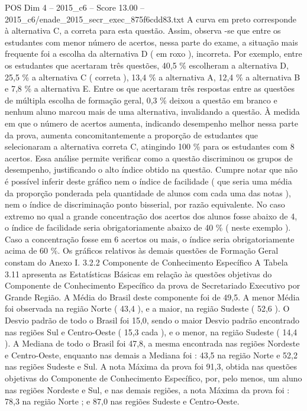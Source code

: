 \begin{textsample}{POS Dim 4 – 2015\_c6 – Score 13.00 – 2015\_c6/enade\_2015\_secr\_exec\_875f6cdd83.txt}
A curva em preto corresponde à alternativa C, a correta para esta questão.
Assim, observa -se que entre os estudantes com menor número de acertos, nessa parte do exame, a situação mais frequente foi a escolha da alternativa D ( em roxo ), incorreta.
Por exemplo, entre os estudantes que acertaram três questões, 40,5 \% escolheram a alternativa D, 25,5 \% a alternativa C ( correta ), 13,4 \% a alternativa A, 12,4 \% a alternativa B e 7,8 \% a alternativa E.
Entre os que acertaram três respostas entre as questões de múltipla escolha de formação geral, 0,3 \% deixou a questão em branco e nenhum aluno marcou mais de uma alternativa, invalidando a questão.
À medida em que o número de acertos aumenta, indicando desempenho melhor nessa parte da prova, aumenta concomitantemente a proporção de estudantes que selecionaram a alternativa correta C, atingindo 100 \% para os estudantes com 8 acertos.
Essa análise permite verificar como a questão discriminou os grupos de desempenho, justificando o alto índice obtido na questão.
Cumpre notar que não é possível inferir deste gráfico nem o índice de facilidade ( que seria uma média da proporção ponderada pela quantidade de alunos com cada uma das notas ), nem o índice de discriminação ponto bisserial, por razão equivalente.
No caso extremo no qual a grande concentração dos acertos dos alunos fosse abaixo de 4, o índice de facilidade seria obrigatoriamente abaixo de 40 \% ( neste exemplo ).
Caso a concentração fosse em 6 acertos ou mais, o índice seria obrigatoriamente acima de 60 \%.
Os gráficos relativos às demais questões de Formação Geral constam do Anexo I. 3.2.2 Componente de Conhecimento Específico A Tabela 3.11 apresenta as Estatísticas Básicas em relação às questões objetivas do Componente de Conhecimento Específico da prova de Secretariado Executivo por Grande Região.
A Média do Brasil deste componente foi de 49,5.
A menor Média foi observada na região Norte ( 43,4 ), e a maior, na região Sudeste ( 52,6 ).
O Desvio padrão de todo o Brasil foi 15,0, sendo o maior Desvio padrão encontrado nas regiões Sul e Centro-Oeste ( 15,3 cada ), e o menor, na região Sudeste ( 14,4 ).
A Mediana de todo o Brasil foi 47,8, a mesma encontrada nas regiões Nordeste e Centro-Oeste, enquanto nas demais a Mediana foi : 43,5 na região Norte e 52,2 nas regiões Sudeste e Sul.
A nota Máxima da prova foi 91,3, obtida nas questões objetivas do Componente de Conhecimento Específico, por, pelo menos, um aluno nas regiões Nordeste e Sul, e nas demais regiões, a nota Máxima da prova foi : 78,3 na região Norte ; e 87,0 nas regiões Sudeste e Centro-Oeste.

\end{textsample}
